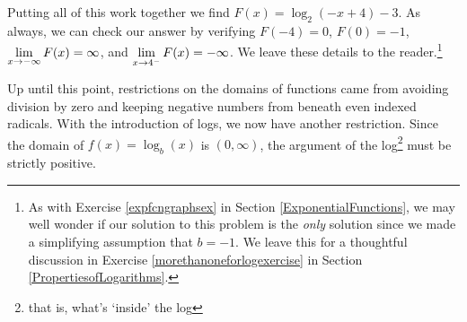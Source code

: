 \documentclass{ximera}
\begin{document}
\begin{ex}
\begin{enumerate}
\smallskip

Putting all of this work together we find $F(x) = \log_{2}(-x+4)-3$.  As always, we can check our answer by verifying $F(-4) = 0$, $F(0) = -1$, $\ds{\lim_{x \rightarrow -\infty} F(x) = \infty}$, and $\ds{\lim_{x \rightarrow 4^{-}} F(x) =  -\infty}$. We leave these details to the reader.\footnote{As with Exercise \ref{expfcngraphsex} in Section \ref{ExponentialFunctions},  we may well wonder if our solution to this problem  is the  \textit{only} solution since we made a simplifying assumption that $b=-1$.  We leave this for a thoughtful discussion in Exercise \ref{morethanoneforlogexercise} in Section \ref{PropertiesofLogarithms}.}

\end{enumerate}

\end{ex}

Up until this point, restrictions on the domains of functions came from avoiding division by zero and keeping negative numbers from beneath even indexed radicals.  With the introduction of logs, we now have another restriction.  Since the domain of $f(x) = \log_{b}(x)$ is $(0, \infty)$, the argument of the log\footnote{ that is, what's `inside' the log}  must be strictly positive.  
\end{document}
